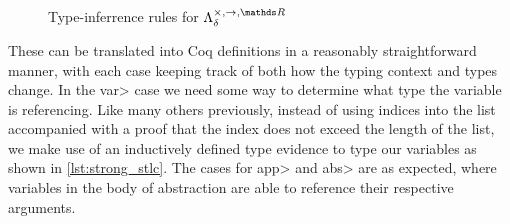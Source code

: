 \documentclass[11pt, final]{article}
\begin{document}
  \begin{figure}
    \caption{Type-inferrence rules for $\lambdaBase$}
    \label{fig:base_infer}
  \end{figure}

  These can be translated into Coq definitions in a reasonably straightforward manner, with each case keeping track of both how the typing context and types change.
  In the \<var> case we need some way to determine what type the variable is referencing.
  Like many others previously\cite{Benton2011}\cite{Coquand1994}, instead of using indices into the list accompanied with a proof that the index does not exceed the length of the list, we make use of an inductively defined type evidence to type our variables as shown in \ref{lst:strong_stlc}.
  The cases for \<app> and \<abs> are as expected, where variables in the body of abstraction are able to reference their respective arguments.
\end{document}
